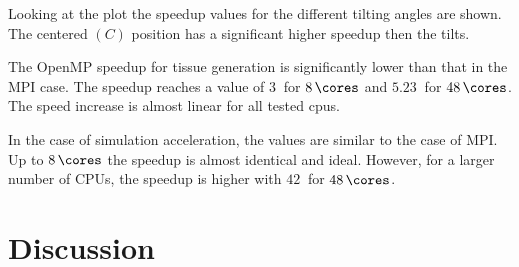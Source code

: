 Looking at the plot the speedup values for the different tilting angles are shown.
The centered $(C)$ position has a significant higher speedup then the tilts.
\par
%
The \ac{OpenMP} speedup for tissue generation is significantly lower than that in the \ac{MPI} case.
The speedup reaches a value of $\SI{3}{}$ for $\SI{8}{\cores}$ and $\SI{5.23}{}$ for $\SI{48}{\cores}$.
The speed increase is almost linear for all tested cpus.
\par
%
In the case of simulation acceleration, the values are similar to the case of \ac{MPI}.
Up to $\SI{8}{\cores}$ the speedup is almost identical and ideal.
However, for a larger number of \acsp{CPU}, the speedup is higher with $\SI{42}{}$ for $\SI{48}{\cores}$.
%
%
\section{Discussion}
%
